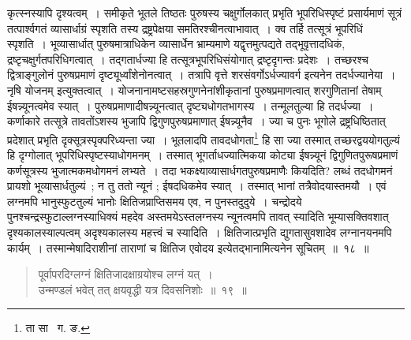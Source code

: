 \documentclass[11pt, openany]{book}
\begin{document}
\newpage

\noindent कृत्स्नस्यापि दृश्यत्वम्~। समीकृते भूतले तिष्ठतः पुरुषस्य चक्षुर्गोलकात् प्रभृति भूपरिधिस्पृष्टं प्रसार्यमाणं सूत्रं तत्पार्श्वगतं
व्यासार्धाग्रं स्पृशति तस्य द्रष्ट्रपेक्षया समतिरश्चीनत्वाभावात्~। क्व तर्हि तत्सूत्रं भूपरिधिं स्पृशति~। भूव्यासार्धात् पुरुषमात्राधिकेन व्यासार्धेन
भ्राम्यमाणे यद्वृत्तमुत्पद्यते तद्भूवृत्तादधिकं, द्रष्टृचक्षुर्गतपरिधिगत्वात्~। तद्गतार्धज्या हि तत्सूत्रभूपरिधिसंयोगात् द्रष्टृदृगन्तः प्रदेशः~। तच्छरश्च 
द्वित्राङ्गुलोनं पुरुषप्रमाणं दृष्ट्यूर्ध्वांशेनोनत्वात्~। तत्रापि वृत्ते {\qt शरसंवर्गोऽर्धज्यावर्ग} इत्यनेन तदर्धज्यानेया~। {\qt नृषि योजनम्} इत्युक्तत्वात्~। 
योजनानामष्टसहस्रगुणनेनांशीकृतानां पुरुषप्रमाणत्वात् शरगुणितानां तेषाम् ईषन्न्यूनत्वमेव स्यात्~। पुरुषप्रमाणादीषन्न्यूनत्वात् दृष्ट्यधोगतभागस्य~। तन्मूलतुल्या हि तदर्धज्या~। कर्णाकारे तत्सूत्रे तावतोंऽशस्य भुजापि द्विगुणपुरुषप्रमाणात् ईषन्न्यूनैव~। ज्या च पुनः भूगोले द्रष्ट्रधिष्ठितात् प्रदेशात् प्रभृति दृक्सूत्रस्पृक्परिध्यन्ता ज्या~। भूतलादपि तावदधोगता\renewcommand{\thefootnote}{१}\footnote{ता सा \textendash\ ग. ङ.} हि सा ज्या तस्मात् तच्छरद्वययोगतुल्यं हि दृग्गोलात् भूपरिधिस्पृष्टस्याधोगमनम्~। तस्मात् भूगर्ताधज्यात्मिकया कोट्या ईषन्न्यूनं द्विगुणितपुरूषप्रमाणं कर्णसूत्रस्य भुजात्मकमधोगमनं लभ्यते~। तदा भकक्ष्याव्यासार्धगतपुरुषप्रमाणैः कियदिति? लब्धं तदधोगमनं 
प्रायशो भूव्यासार्धतुल्यं~; न तु ततो न्यूनं ; ईषदधिकमेव स्यात्~। तस्मात् भानां तत्रैवोदयास्तमयौ~। एवं लग्नमपि भानुस्फुटतुल्यं भानोः क्षितिजप्राप्तिसमय एव, न पुनस्तदुदुये~। चन्द्रोदये पुनश्चन्द्रस्फुटाल्लग्नस्याधिक्यं महदेव अस्तमयेऽस्तलग्नस्य न्यूनत्वमपि तावत् स्यादिति भूम्यासक्तिवशात् दृश्यकालस्याल्पत्वम् अदृश्यकालस्य महत्त्वं च स्यादिति~। क्षितिजात्प्रभृति द्युगतासुवशादेव लग्नानयनमपि कार्यम्~। तस्मान्मेषादिराशीनां ताराणां च क्षितिज एवोदय इत्येतद्भानामित्यनेन सूचितम्~॥~१८~॥

\newpage

\begin{quote}
{\ab पूर्वापरदिग्लग्नं क्षितिजादक्षाग्रयोश्च लग्नं यत्~। \\
 उन्मण्डलं भवेत् तत् क्षयवृद्धी यत्र दिवसनिशोः~॥~१९~॥}  
\end{quote}
\end{document}
